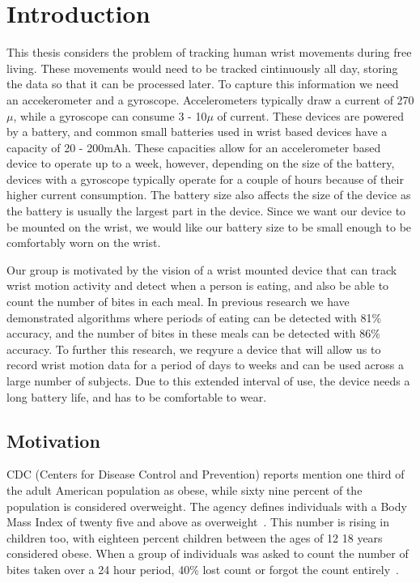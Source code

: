 
\chapter{Introduction}
\label{Chap:Intro}
This thesis considers the problem of tracking human wrist movements during free living.
These movements would need to be tracked cintinuously all day,
storing the data so that it can be processed later.
To capture this information we need an accekerometer and a gyroscope.
Accelerometers typically draw a current of 270$\mu$,
while a gyroscope can consume 3 - 10$\mu$ of current.
These devices are powered by a battery,
and common small batteries used in wrist based devices have a capacity of 20 - 200mAh.
These capacities allow for an accelerometer based device to operate up to a week,
however, depending on the size of the battery,
devices with a gyroscope typically operate for a couple of hours because of their higher current consumption.
The battery size also affects the size of the device as the battery is usually the largest part in the device.
Since we want our device to be mounted on the wrist,
we would like our battery size to be small enough to be comfortably worn on the wrist.

Our group is motivated by the vision of a wrist mounted device that can track wrist motion activity and
detect when a person is eating,
and also be able to count the number of bites in each meal.
In previous research we have demonstrated algorithms where periods of eating can be detected with 81\% accuracy,
and the number of bites in these meals can be detected with 86\% accuracy.
To further this research,
we reqyure a device that will allow us to record wrist motion data for a period of days to weeks and can be used across a large number of subjects.
Due to this extended interval of use,
the device needs a long battery life,
and has to be comfortable to wear.


\section{Motivation}
\label{Sec:Motivation}

 CDC (Centers for Disease Control and Prevention) reports mention one
 \textemdash{} third of the adult American population as 
 obese, while sixty nine percent of the population is considered 
 overweight. The agency defines individuals with a Body Mass
 Index of twenty five and above as overweight~\cite{ogden2010prevalence}.
 This number is rising in children too, with eighteen
 percent children between the ages of 12 \textemdash{} 18
 years considered obese. When a group
 of individuals was asked to count the number of bites taken over
 a 24 hour period, 40\% lost count or forgot the count entirely~\cite{mahoney1975obese}.

